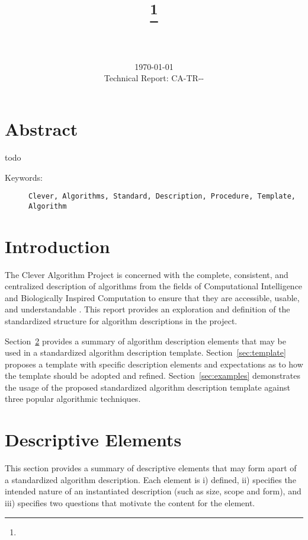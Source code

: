 \documentclass[a4paper, 11pt]{article}
\title{{\myreporttitle}\footnote{\myreportlicense}}
\author{\myreportauthor\\{\myreportemail}\\\small\myreportproject}
\date{\today\\{\small{Technical Report: CA-TR-{\myreportdate}-\myreportversion}}}
\begin{document}
\maketitle

\section*{Abstract} 
todo

\begin{description}
	\item[Keywords:] {\small\texttt{Clever, Algorithms, Standard, Description, Procedure, Template, Algorithm}}
\end{description} 

\section{Introduction}
\label{sec:introduction}
The Clever Algorithm Project is concerned with the complete, consistent, and centralized description of algorithms from the fields of Computational Intelligence and Biologically Inspired Computation to ensure that they are accessible, usable, and understandable \cite{Brownlee2010}.
This report provides an exploration and definition of the standardized structure for algorithm descriptions in the project.

Section~\ref{sec:elements} provides a summary of algorithm description elements that may be used in a standardized algorithm description template. Section~\ref{sec:template} proposes a template with specific description elements and expectations as to how the template should be adopted and refined. Section~\ref{sec:examples} demonstrates the usage of the proposed standardized algorithm description template against three popular algorithmic techniques.

\section{Descriptive Elements}
\label{sec:elements}
This section provides a summary of descriptive elements that may form apart of a standardized algorithm description. Each element is i) defined, ii) specifies the intended nature of an instantiated description (such as size, scope and form), and iii) specifies two questions that motivate the content for the element.
\end{document}
